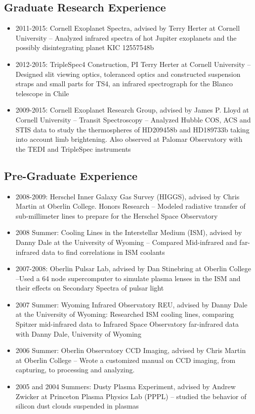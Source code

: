 \documentclass[11pt, oneside]{article}   	%
\begin{document}
\subsection*{Graduate Research Experience}
\begin{itemize}[noitemsep]
	\item 2011-2015: Cornell Exoplanet Spectra, advised by Terry Herter at Cornell University -- Analyzed infrared spectra of hot Jupiter exoplanets and the possibly disintegrating planet KIC 12557548b
	\item 2012-2015: TripleSpec4 Construction, PI Terry Herter at Cornell University -- Designed slit viewing optics, toleranced optics and constructed suspension straps and small parts for TS4, an infrared spectrograph for the Blanco telescope in Chile
	\item 2009-2015: Cornell Exoplanet Research Group, advised by James P. Lloyd at Cornell University -- Transit Spectroscopy -- Analyzed Hubble COS, ACS and STIS data to study the thermospheres of HD209458b and HD189733b taking into account limb brightening. Also observed at Palomar Observatory with the TEDI and TripleSpec instruments
\end{itemize}

\subsection*{Pre-Graduate Experience}
\begin{itemize}[noitemsep]
	\item 2008-2009: Herschel Inner Galaxy Gas Survey (HIGGS), advised by Chris Martin at Oberlin College. Honors Research -- Modeled radiative transfer of sub-millimeter lines to prepare for the Herschel Space Observatory
	\item 2008 Summer: Cooling Lines in the Interstellar Medium (ISM), advised by Danny Dale at the University of Wyoming -- Compared Mid-infrared and far-infrared data to find correlations in ISM coolants
	\item 2007-2008: Oberlin Pulsar Lab, advised by Dan Stinebring at Oberlin College --Used a 64 node supercomputer to simulate plasma lenses in the ISM and their effects on Secondary Spectra of pulsar light
	\item 2007 Summer: Wyoming Infrared Observatory REU, advised by Danny Dale at the University of Wyoming: Researched ISM cooling lines, comparing Spitzer mid-infrared data to Infrared Space Observatory far-infrared data with Danny Dale, University of Wyoming
	\item 2006 Summer: Oberlin Observatory CCD Imaging, advised by Chris Martin at Oberlin College -- Wrote a customized manual on CCD imaging, from capturing, to processing and analyzing.
	\item 2005 and 2004 Summers: Dusty Plasma Experiment, advised by Andrew Zwicker at Princeton Plasma Physics Lab (PPPL) -- studied the behavior of silicon dust clouds suspended in plasmas
\end{itemize}
\end{document}
